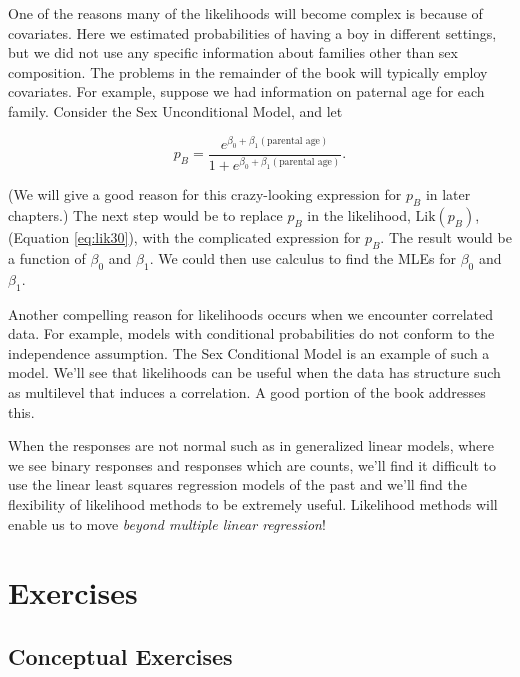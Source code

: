 \documentclass[
]{krantz}
\newcommand{\Lik}{\mathrm{Lik}}
\begin{document}
One of the reasons many of the likelihoods will become complex is because of covariates. Here we estimated probabilities of having a boy in different settings, but we did not use any specific information about families other than sex composition. The problems in the remainder of the book will typically employ covariates. For example, suppose we had information on paternal age for each family. Consider the Sex Unconditional Model, and let

\[
p_B= \frac{e^{\beta_0+\beta_1(\textrm{parental age})}}
{1+e^{\beta_0+\beta_1(\textrm{parental age})}}.
\]

(We will give a good reason for this crazy-looking expression for \(p_B\) in later chapters.) The next step would be to replace \(p_B\) in the likelihood, \(\Lik(p_B)\), (Equation \eqref{eq:lik30}), with the complicated expression for \(p_B\). The result would be a function of \(\beta_0\) and \(\beta_1\). We could then use calculus to find the MLEs for \(\beta_0\) and \(\beta_1\).

Another compelling reason for likelihoods occurs when we encounter correlated data. For example, models with conditional probabilities do not conform to the independence assumption. The Sex Conditional Model is an example of such a model. We'll see that likelihoods can be useful when the data has structure such as multilevel that induces a correlation. A good portion of the book addresses this.

When the responses are not normal such as in generalized linear models, where we see binary responses and responses which are counts, we'll find it difficult to use the linear least squares regression models of the past and we'll find the flexibility of likelihood methods to be extremely useful. Likelihood methods will enable us to move \emph{beyond multiple linear regression}!

\section{Exercises}\label{exercises-1}

\subsection{Conceptual Exercises}\label{conceptual-exercises-1}
\end{document}
